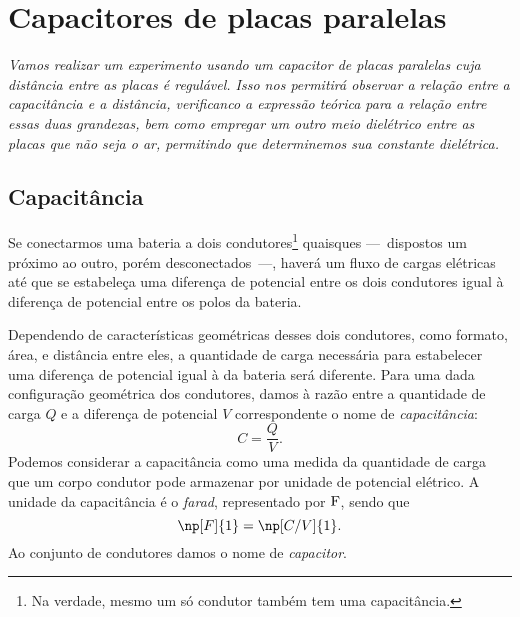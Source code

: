 \chapter{Capacitores de placas paralelas} %
\label{Chap:CapacPlacasPar}        %

\begin{fullwidth}\it
	Vamos realizar um experimento usando um capacitor de placas paralelas cuja distância entre as placas é regulável. Isso nos permitirá observar a relação entre a capacitância e a distância, verificanco a expressão teórica para a relação entre essas duas grandezas, bem como empregar um outro meio dielétrico entre as placas que não seja o ar, permitindo que determinemos sua constante dielétrica.
\end{fullwidth}

\section{Capacitância}

Se conectarmos uma bateria a dois condutores\footnote{Na verdade, mesmo um só condutor também tem uma capacitância.} quaisques ---~dispostos um próximo ao outro, porém desconectados~---, haverá um fluxo de cargas elétricas até que se estabeleça uma diferença de potencial entre os dois condutores igual à diferença de potencial entre os polos da bateria.

Dependendo de características geométricas desses dois condutores, como formato, área, e distância entre eles, a quantidade de carga necessária para estabelecer uma diferença de potencial igual à da bateria será diferente. Para uma dada configuração geométrica dos condutores, damos à razão entre a quantidade de carga $Q$ e a diferença de potencial $V$ correspondente o nome de \emph{capacitância}:
\begin{equation}
	C = \frac{Q}{V}.
\end{equation}
%
Podemos considerar a capacitância como uma medida da quantidade de carga que um corpo condutor pode armazenar por unidade de potencial elétrico. A unidade da capacitância é o \emph{farad}, representado por $\rm{F}$, sendo que
\begin{equation}
	\np[F]{1} = \np[C/V]{1}.
\end{equation}
%
Ao conjunto de condutores damos o nome de \emph{capacitor}.

